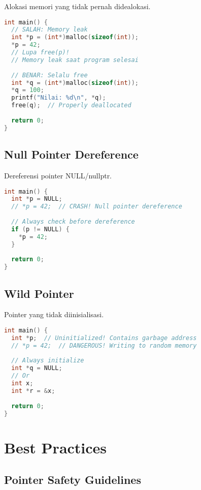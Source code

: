 \documentclass[../main.tex]{subfiles}
\begin{document}
Alokasi memori yang tidak pernah didealokasi.

\begin{lstlisting}[language=C, caption={Memory leak}]
int main() {
  // SALAH: Memory leak
  int *p = (int*)malloc(sizeof(int));
  *p = 42;
  // Lupa free(p)!
  // Memory leak saat program selesai
  
  // BENAR: Selalu free
  int *q = (int*)malloc(sizeof(int));
  *q = 100;
  printf("Nilai: %d\n", *q);
  free(q);  // Properly deallocated
  
  return 0;
}
\end{lstlisting}

\subsection{Null Pointer Dereference}

Dereferensi pointer NULL/nullptr.

\begin{lstlisting}[language=C, caption={Null pointer dereference}]
int main() {
  int *p = NULL;
  // *p = 42;  // CRASH! Null pointer dereference
  
  // Always check before dereference
  if (p != NULL) {
    *p = 42;
  }
  
  return 0;
}
\end{lstlisting}

\subsection{Wild Pointer}

Pointer yang tidak diinisialisasi.

\begin{lstlisting}[language=C, caption={Wild pointer}]
int main() {
  int *p;  // Uninitialized! Contains garbage address
  // *p = 42;  // DANGEROUS! Writing to random memory
  
  // Always initialize
  int *q = NULL;
  // Or
  int x;
  int *r = &x;
  
  return 0;
}
\end{lstlisting}

\section{Best Practices}

\subsection{Pointer Safety Guidelines}
\end{document}
